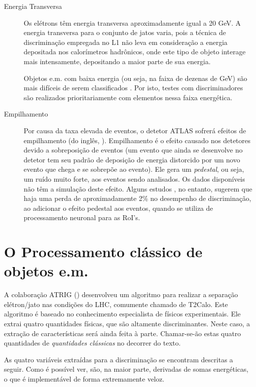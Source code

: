 \begin{description}
\item[Energia Transversa] Os elétrons têm energia transversa aproximadamente
igual a 20 GeV. A energia transversa para o conjunto de jatos varia, pois a
técnica de discriminação empregada no L1 não leva em consideração a energia
depositada nos calorímetros hadrônicos, onde este tipo de objeto interage mais
intensamente, depositando a maior parte de sua energia.

Objetos e.m. com baixa energia (ou seja, na faixa de dezenas de GeV) são mais
difíceis de serem classificados \cite{hlt-tdr}. Por isto, testes com
discriminadores são realizados prioritariamente com elementos nessa faixa
energética.

\item[Empilhamento] Por causa da taxa elevada de eventos, o detetor ATLAS
sofrerá efeitos de empilhamento (do inglês, ). Empilhamento é o
efeito causado nos detetores devido a sobreposição de eventos (um evento que
ainda se desenvolve no detetor tem seu padrão de deposição de energia
distorcido por um novo evento que chega e se sobrepõe ao evento). Ele gera um
\textit{pedestal}, ou seja, um ruído muito forte, aos eventos sendo
analisados. Os dados disponíveis não têm a simulação deste efeito. Alguns
estudos \cite{seixas:pileup, seixas:perf-loss}, no entanto, sugerem que haja
uma perda de aproximadamente 2\% no desempenho de discriminação, ao adicionar
o efeito pedestal aos eventos, quando se utiliza de processamento neuronal para
as RoI's.
\end{description}

\section{O Processamento clássico de objetos e.m.}
\label{sec:classical}

A colaboração ATRIG () desenvolveu um algoritmo para
realizar a separa\-ção e\-lé\-tron\-/\-jato nas condições do LHC, comumente
chamado de \textsf{T2Calo}. Este algoritmo é baseado no conhecimento
especialista de físicos experimentais. Ele extrai quatro quantidades físicas,
que são altamente discriminantes. Neste caso, a extração de características
será ainda feita à parte. Chamar-se-ão estas quatro quantidades de
\emph{quantidades clássicas} no decorrer do texto.

As quatro variáveis extraídas para a discriminação se encontram descritas a
seguir. Como é possível ver, são, na maior parte, derivadas de somas
energéticas, o que é implementável de forma extremamente veloz.

